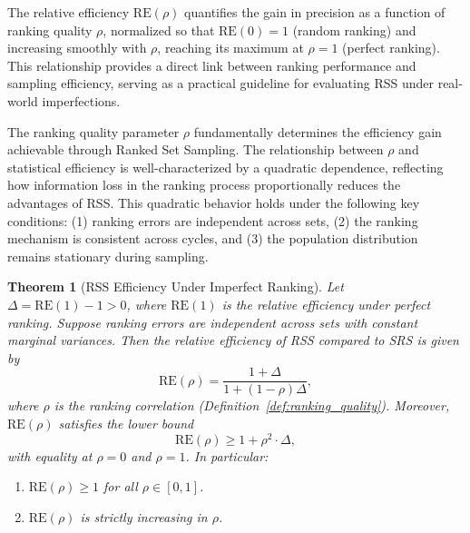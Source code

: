 \documentclass[12pt]{article}
\newtheorem{theorem}{Theorem}[section]
\begin{document}
The relative efficiency $\text{RE}(\rho)$ quantifies the gain in precision as a function of ranking quality $\rho$, normalized so that $\text{RE}(0) = 1$ (random ranking) and increasing smoothly with $\rho$, reaching its maximum at $\rho=1$ (perfect ranking). This relationship provides a direct link between ranking performance and sampling efficiency, serving as a practical guideline for evaluating RSS under real-world imperfections.

The ranking quality parameter $\rho$ fundamentally determines the efficiency gain achievable through Ranked Set Sampling. The relationship between $\rho$ and statistical efficiency is well-characterized by a quadratic dependence, reflecting how information loss in the ranking process proportionally reduces the advantages of RSS. This quadratic behavior holds under the following key conditions: (1) ranking errors are independent across sets, (2) the ranking mechanism is consistent across cycles, and (3) the population distribution remains stationary during sampling.

\begin{theorem}[RSS Efficiency Under Imperfect Ranking]
\label{thm:rss_efficiency}
Let $\Delta = \mathrm{RE}(1) - 1 > 0$, where $\mathrm{RE}(1)$ is the relative efficiency under perfect ranking. Suppose ranking errors are independent across sets with constant marginal variances. Then the relative efficiency of RSS compared to SRS is given by
\begin{equation}\label{eq:re_rho_exact}
\mathrm{RE}(\rho) = \frac{1 + \Delta}{1 + (1 - \rho)\Delta},
\end{equation}
where $\rho$ is the ranking correlation (Definition~\ref{def:ranking_quality}). Moreover, $\mathrm{RE}(\rho)$ satisfies the lower bound
\begin{equation}\label{eq:re_rho_bound}
\mathrm{RE}(\rho) \geq 1 + \rho^2 \cdot \Delta,
\end{equation}
with equality at $\rho = 0$ and $\rho = 1$. In particular:
\begin{enumerate}
\item $\mathrm{RE}(\rho) \geq 1$ for all $\rho \in [0,1]$.
\item $\mathrm{RE}(\rho)$ is strictly increasing in $\rho$.
\end{enumerate}
\end{theorem}
\end{document}
